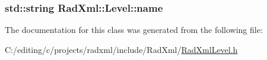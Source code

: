 \hypertarget{class_rad_xml_1_1_level_abc776669bbb0f37a6eed054b3708807b}{
\subsubsection[{name}]{\setlength{\rightskip}{0pt plus 5cm}std\-::string Rad\-Xml\-::\-Level\-::name\hspace{0.3cm}{\ttfamily [protected]}}}\label{class_rad_xml_1_1_level_abc776669bbb0f37a6eed054b3708807b}


The documentation for this class was generated from the following file\-:\begin{DoxyCompactItemize}
\item 
C\-:/editing/c/projects/radxml/include/\-Rad\-Xml/\hyperlink{_rad_xml_level_8h}{Rad\-Xml\-Level.\-h}\end{DoxyCompactItemize}
